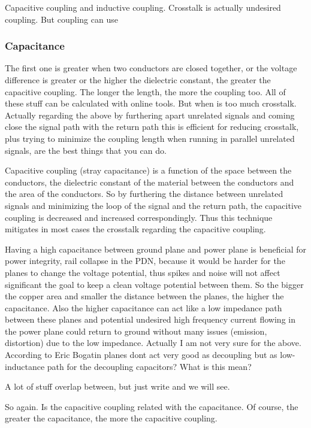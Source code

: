 \documentclass[12pt]{article}
\begin{document}
Capacitive coupling and inductive coupling. Crosstalk is actually undesired coupling. But coupling can use 

\subsubsection{Capacitance}
The first one is greater when two conductors are closed together, or the voltage difference is greater or the higher the dielectric constant, the greater the capacitive coupling. The longer the length, the more the coupling too. All of these stuff can be calculated with online tools. But when is too much crosstalk. Actually regarding the above by furthering apart unrelated signals and coming close the signal path with the return path this is efficient for reducing crosstalk, plus trying to minimize the coupling length when running in parallel unrelated signals, are the best things that you can do. 

Capacitive coupling (stray capacitance) is a function of the space between the conductors, the dielectric constant of the material between the conductors and the area of the conductors.	So by furthering the distance between unrelated signals and minimizing the loop of the signal and the return path, the capacitive coupling is decreased and increased correspondingly. Thus this technique mitigates in most cases the crosstalk regarding the capacitive coupling.

Having a high capacitance between ground plane and power plane is beneficial for power integrity, rail collapse in the PDN, because it would be harder for the planes to change the voltage potential, thus spikes and noise will not affect significant the goal to keep a clean voltage potential between them. So the bigger the copper area and smaller the distance between the planes, the higher the capacitance. Also the higher capacitance can act like a low impedance path between these planes and potential undesired high frequency current flowing in the power plane could return to ground without many issues (emission, distortion) due to the low impedance. Actually I am not very sure for the above. According to Eric Bogatin planes dont act very good as decoupling but as low-inductance path for the decoupling capacitors? What is this mean?

A lot of stuff overlap between, but just write and we will see.

So again. Is the capacitive coupling related with the capacitance. Of course, the greater the capacitance, the more the capacitive coupling.
\end{document}
